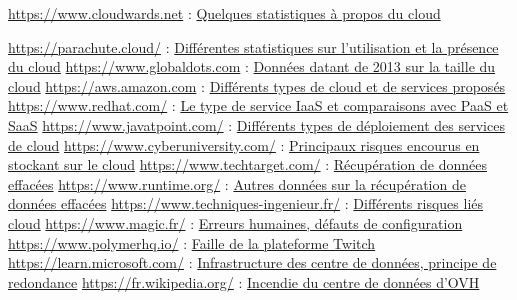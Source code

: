 \documentclass[a4paper, 12pt]{article}
\begin{document}
\begin{spacing}{1.1}
\begin{thebibliography}{3}
    \bibitem{} \url{https://www.cloudwards.net} : \href{https://www.cloudwards.net/cloud-computing-statistics/}{Quelques statistiques à propos du cloud}

    \bibitem{} \url{https://parachute.cloud/} : \href{https://parachute.cloud/cloud-computing-statistics/}{Différentes statistiques sur l'utilisation et la présence du cloud}
    \bibitem{} \url{https://www.globaldots.com} : \href{https://www.globaldots.com/resources/blog/how-much-is-stored-in-the-cloud/}{Données datant de 2013 sur la taille du cloud}
    \bibitem{} \url{https://aws.amazon.com} : \href{https://aws.amazon.com/fr/types-of-cloud-computing/}{Différents types de cloud et de services proposés}
    \bibitem{} \url{https://www.redhat.com/} : \href{https://www.redhat.com/fr/topics/cloud-computing/what-is-iaas}{Le type de service IaaS et comparaisons avec PaaS et SaaS}
    \bibitem{} \url{https://www.javatpoint.com/} : \href{https://www.javatpoint.com/cloud-deployment-model}{Différents types de déploiement des services de cloud}
    \bibitem{} \url{https://www.cyberuniversity.com/} : \href{https://www.cyberuniversity.com/post/la-securite-dans-le-cloud-principaux-risques-et-challenges}{Principaux risques encourus en stockant sur le cloud}
    \bibitem{} \url{https://www.techtarget.com/} : \href{https://www.techtarget.com/searchdisasterrecovery/definition/data-recovery}{Récupération de données effacées}
    \bibitem{} \url{https://www.runtime.org/} : \href{https://www.runtime.org/recoverability.htm}{Autres données sur la récupération de données effacées}
    \bibitem{} \url{https://www.techniques-ingenieur.fr/} : \href{https://www.techniques-ingenieur.fr/actualite/articles/la-securite-dans-le-cloud-une-approche-fournisseur-basee-sur-les-risques-15550/}{Différents risques liés cloud}
    \bibitem{} \url{https://www.magic.fr/} : \href{https://www.magic.fr/cloud-public-les-erreurs-de-configuration-sont-extremement-frequentes/}{Erreurs humaines, défauts de configuration}
    \bibitem{} \url{https://www.polymerhq.io/} : \href{https://www.polymerhq.io/blog/breach/how-did-the-twitch-data-leak-happen/}{Faille de la plateforme Twitch}
    \bibitem{} \url{https://learn.microsoft.com/} : \href{https://learn.microsoft.com/fr-fr/compliance/assurance/assurance-datacenter-architecture-infrastructure}{Infrastructure des centre de données, principe  de redondance}
    \bibitem{} \url{https://fr.wikipedia.org/} : \href{https://fr.wikipedia.org/wiki/Incendie_du_centre_de_donn%C3%A9es_d%27OVHcloud_%C3%A0_Strasbourg}{Incendie du centre de données d'OVH}


\end{thebibliography}
\end{spacing}
\end{document}

